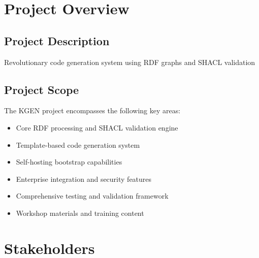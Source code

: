 \documentclass[11pt,a4paper]{article}
\begin{document}
\section{Project Overview}

\subsection{Project Description}
Revolutionary code generation system using RDF graphs and SHACL validation

\subsection{Project Scope}
The KGEN project encompasses the following key areas:
\begin{itemize}[leftmargin=2cm]
    \item Core RDF processing and SHACL validation engine
    \item Template-based code generation system
    \item Self-hosting bootstrap capabilities
    \item Enterprise integration and security features
    \item Comprehensive testing and validation framework
    \item Workshop materials and training content
\end{itemize}

\section{Stakeholders}
\end{document}
